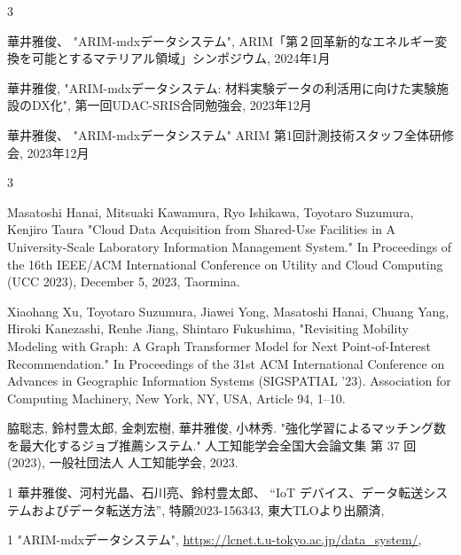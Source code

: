 \begin{招待講演}{3}

華井雅俊、
"ARIM-mdxデータシステム",
ARIM「第２回革新的なエネルギー変換を可能とするマテリアル領域」シンポジウム,
2024年1月

華井雅俊,
"ARIM-mdxデータシステム: 材料実験データの利活用に向けた実験施設のDX化", 
第一回UDAC-SRIS合同勉強会,
2023年12月

華井雅俊、
"ARIM-mdxデータシステム"
ARIM 第1回計測技術スタッフ全体研修会,
2023年12月

\end{招待講演}

\begin{査読付}{3}

Masatoshi Hanai, Mitsuaki Kawamura, Ryo Ishikawa, Toyotaro Suzumura, Kenjiro Taura
"Cloud Data Acquisition from Shared-Use Facilities in A University-Scale Laboratory Information Management System."
In Proceedings of the 16th IEEE/ACM International Conference on Utility and Cloud Computing (UCC 2023), December 5, 2023, Taormina.

Xiaohang Xu, Toyotaro Suzumura, Jiawei Yong, Masatoshi Hanai, Chuang Yang, Hiroki Kanezashi, Renhe Jiang, Shintaro Fukushima, 
"Revisiting Mobility Modeling with Graph: A Graph Transformer Model for Next Point-of-Interest Recommendation."
In Proceedings of the 31st ACM International Conference on Advances in Geographic Information Systems (SIGSPATIAL ’23). Association for Computing Machinery, New York, NY, USA, Article
94, 1–10.

脇聡志, 鈴村豊太郎, 金刺宏樹, 華井雅俊, 小林秀. "強化学習によるマッチング数を最大化するジョブ推薦システム." 人工知能学会全国大会論文集 第 37 回 (2023), 一般社団法人 人工知能学会, 2023.

\end{査読付}


\begin{特許}{1}
華井雅俊、河村光晶、石川亮、鈴村豊太郎、
“IoT デバイス、データ転送システムおよびデータ転送方法”,
特願2023-156343,
東大TLOより出願済,
\end{特許}

\begin{公開}{1}
"ARIM-mdxデータシステム",
\url{https://lcnet.t.u-tokyo.ac.jp/data_system/},
\end{公開}


